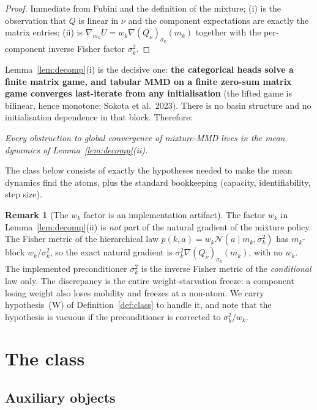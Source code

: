 \documentclass[11pt]{article}
\theoremstyle{definition}
\newtheorem{remark}{Remark}
\newcommand{\cN}{\mathcal{N}}
\begin{document}
\begin{proof}
Immediate from Fubini and the definition of the mixture; (i) is the observation
that $Q$ is linear in $\nu$ and the component expectations are exactly the matrix
entries; (ii) is $\nabla_{m_k} U = w_k \nabla (Q_\nu)_{\sigma_k}(m_k)$ together
with the per-component inverse Fisher factor $\sigma_k^2$.
\end{proof}

Lemma~\ref{lem:decomp}(i) is the decisive one: \textbf{the categorical heads
solve a finite matrix game, and tabular MMD on a finite zero-sum matrix game
converges last-iterate from any initialisation} (the lifted game is bilinear,
hence monotone; Sokota et al.\ 2023). There is no basin structure and no
initialisation dependence in that block. Therefore:

\begin{center}
\emph{Every obstruction to global convergence of mixture-MMD lives in the mean
dynamics of Lemma~\ref{lem:decomp}(ii).}
\end{center}

The class below consists of exactly the hypotheses needed to make the mean
dynamics find the atoms, plus the standard bookkeeping (capacity,
identifiability, step size).

\begin{remark}[The $w_k$ factor is an implementation artifact]\label{rem:wk}
The factor $w_k$ in Lemma~\ref{lem:decomp}(ii) is \emph{not} part of the natural
gradient of the mixture policy. The Fisher metric of the hierarchical law
$p(k,a) = w_k \cN(a \mid m_k, \sigma_k^2)$ has $m_k$-block $w_k/\sigma_k^2$, so
the exact natural gradient is $\sigma_k^2 \nabla (Q_\nu)_{\sigma_k}(m_k)$, with no
$w_k$. The implemented preconditioner $\sigma_k^2$ is the inverse Fisher metric
of the \emph{conditional} law only. The discrepancy is the entire
weight-starvation freeze: a component losing weight also loses mobility and
freezes at a non-atom. We carry hypothesis~(W) of Definition~\ref{def:class} to handle it,
and note that the hypothesis is vacuous if the preconditioner is corrected to
$\sigma_k^2/w_k$.
\end{remark}

\section{The class}

\subsection{Auxiliary objects}
\end{document}
